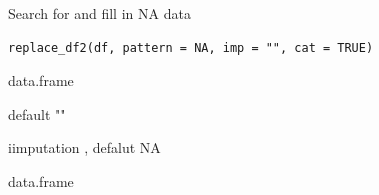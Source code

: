 \documentclass[a4paper]{book}
\begin{document}
%
\begin{Description}
Search for and fill in NA data
\end{Description}
%
\begin{Usage}
\begin{verbatim}
replace_df2(df, pattern = NA, imp = "", cat = TRUE)
\end{verbatim}
\end{Usage}
%
\begin{Arguments}
\begin{ldescription}
\item[\code{df}] data.frame

\item[\code{pattern}] default ""

\item[\code{imp}] iimputation , defalut NA
\end{ldescription}
\end{Arguments}
%
\begin{Value}
data.frame
\end{Value}
\end{document}
